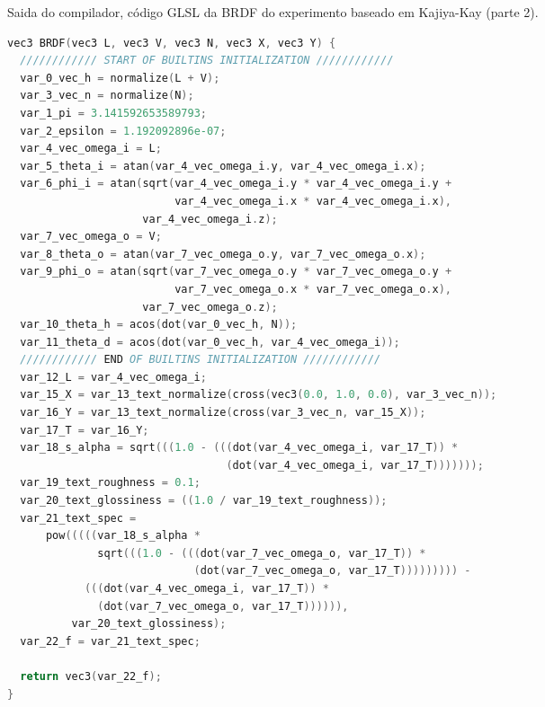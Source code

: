 \begin{codigo}[H]
    \caption{\small Saida do compilador, código GLSL da BRDF do experimento baseado em Kajiya-Kay (parte 2). }
    \label{cod-kajiya-glsl-pt-2}
\begin{lstlisting}[language=C, inputencoding=utf8]
vec3 BRDF(vec3 L, vec3 V, vec3 N, vec3 X, vec3 Y) {
  //////////// START OF BUILTINS INITIALIZATION ////////////
  var_0_vec_h = normalize(L + V);
  var_3_vec_n = normalize(N);
  var_1_pi = 3.141592653589793;
  var_2_epsilon = 1.192092896e-07;
  var_4_vec_omega_i = L;
  var_5_theta_i = atan(var_4_vec_omega_i.y, var_4_vec_omega_i.x);
  var_6_phi_i = atan(sqrt(var_4_vec_omega_i.y * var_4_vec_omega_i.y +
                          var_4_vec_omega_i.x * var_4_vec_omega_i.x),
                     var_4_vec_omega_i.z);
  var_7_vec_omega_o = V;
  var_8_theta_o = atan(var_7_vec_omega_o.y, var_7_vec_omega_o.x);
  var_9_phi_o = atan(sqrt(var_7_vec_omega_o.y * var_7_vec_omega_o.y +
                          var_7_vec_omega_o.x * var_7_vec_omega_o.x),
                     var_7_vec_omega_o.z);
  var_10_theta_h = acos(dot(var_0_vec_h, N));
  var_11_theta_d = acos(dot(var_0_vec_h, var_4_vec_omega_i));
  //////////// END OF BUILTINS INITIALIZATION ////////////
  var_12_L = var_4_vec_omega_i;
  var_15_X = var_13_text_normalize(cross(vec3(0.0, 1.0, 0.0), var_3_vec_n));
  var_16_Y = var_13_text_normalize(cross(var_3_vec_n, var_15_X));
  var_17_T = var_16_Y;
  var_18_s_alpha = sqrt(((1.0 - (((dot(var_4_vec_omega_i, var_17_T)) *
                                  (dot(var_4_vec_omega_i, var_17_T)))))));
  var_19_text_roughness = 0.1;
  var_20_text_glossiness = ((1.0 / var_19_text_roughness));
  var_21_text_spec =
      pow(((((var_18_s_alpha *
              sqrt(((1.0 - (((dot(var_7_vec_omega_o, var_17_T)) *
                             (dot(var_7_vec_omega_o, var_17_T))))))))) -
            (((dot(var_4_vec_omega_i, var_17_T)) *
              (dot(var_7_vec_omega_o, var_17_T)))))),
          var_20_text_glossiness);
  var_22_f = var_21_text_spec;

  return vec3(var_22_f);
}


\end{lstlisting}
\end{codigo}

